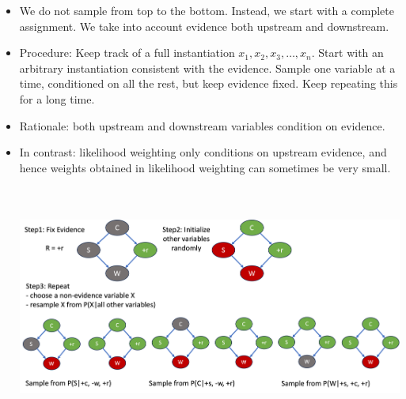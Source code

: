\documentclass[11pt,a4paper]{report}
\begin{document}
\begin{itemize}
    \item We do not sample from top to the bottom. Instead, we start with a complete assignment. We take into account evidence both upstream and downstream.
    
    \item Procedure: Keep track of a full instantiation $x_{1}, x_{2}, x_{3}, \ldots, x_{n}$. Start with an arbitrary instantiation consistent with the evidence. Sample one variable at a time, conditioned on all the rest, but keep evidence fixed. Keep repeating this for a long time.
    
    \item Rationale: both upstream and downstream variables condition on evidence.
    
    \item In contrast: likelihood weighting only conditions on upstream evidence, and hence weights obtained in likelihood weighting can sometimes be very small.
    
    \includegraphics[width=15cm, height = 8cm]{gibbs.png}\\
\end{itemize}
\end{document}

